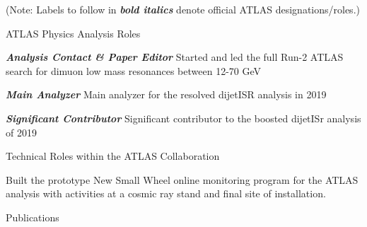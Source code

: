 \hspace{0.45in}
\begin{minipage}{0.8\textwidth}

(Note: Labels to follow in \textbf{\textit{bold italics}} denote official ATLAS designations/roles.)
\vspace{0.15in}

ATLAS Physics Analysis Roles
\vspace{0.1in}

\hspace{0.2in}
\begin{minipage}{\textwidth}
\textbf{\textit{Analysis Contact \& Paper Editor}} Started and led the full Run-2 ATLAS search for dimuon low mass resonances between 12-70 GeV
\end{minipage}

\vspace{0.1in}
\hspace{0.2in}
\begin{minipage}{\textwidth}
\textbf{\textit{Main Analyzer}} Main analyzer for the resolved dijetISR analysis in 2019%
\end{minipage}


\vspace{0.1in}
\hspace{0.2in}
\begin{minipage}{\textwidth}
\textbf{\textit{Significant Contributor}} Significant contributor to the boosted dijetISr analysis of 2019%

\vspace{0.15in}
Technical Roles within the ATLAS Collaboration

\vspace{0.15in}
\hspace{0.2in}
\begin{minipage}{\textwidth}
    Built the prototype New Small Wheel online monitoring program for the ATLAS analysis with activities at a cosmic ray stand and final site of installation.
\end{minipage}



\end{minipage}

\newpage
\vspace{0.25in}
{\Large Publications}\\
\HRule


\end{minipage}
